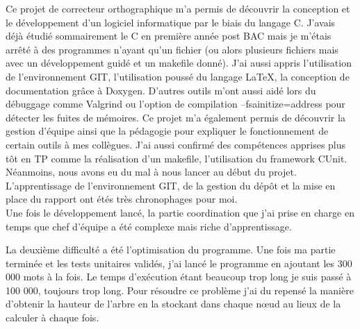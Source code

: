 Ce projet de correcteur orthographique m'a permis de découvrir la conception et le développement d'un logiciel informatique par le biais du langage C.
J'avais déjà étudié sommairement le C en première année post BAC mais je m'étais arrêté à des programmes n'ayant qu'un fichier 
(ou alors plusieurs fichiers mais avec un développement guidé et un makefile donné).
J'ai aussi appris l'utilisation de l'environnement GIT, l'utilisation poussé du langage \LaTeX, la conception de documentation grâce à Doxygen.
D'autres outils m'ont aussi aidé lors du débuggage comme Valgrind ou l'option de compilation --fsainitize=address pour détecter les fuites de mémoires. 
Ce projet m'a également permis de découvrir la gestion d'équipe ainsi que la pédagogie pour expliquer le fonctionnement de certain outils à mes collègues. 
J'ai aussi confirmé des compétences apprises plus tôt en TP comme la réalisation d'un makefile, l'utilisation du framework CUnit.\\

Néanmoins, nous avons eu du mal à nous lancer au début du projet.
L'apprentissage de l'environnement GIT, de la gestion du dépôt et la mise en place du rapport ont étés très chronophages pour moi.\\

Une fois le développement lancé, la partie coordination que j'ai prise en charge en temps que chef d'équipe a été complexe mais riche d'apprentissage.

La deuxième difficulté a été l'optimisation du programme. 
Une fois ma partie terminée et les tests unitaires validés, j'ai lancé le programme en ajoutant les 300 000 mots à la fois.
Le temps d’exécution étant beaucoup trop long je suis passé à 100 000, toujours trop long.
Pour résoudre ce problème j'ai du repensé la manière d'obtenir la hauteur de l'arbre en la stockant dans chaque nœud au lieux de la calculer à chaque fois.
